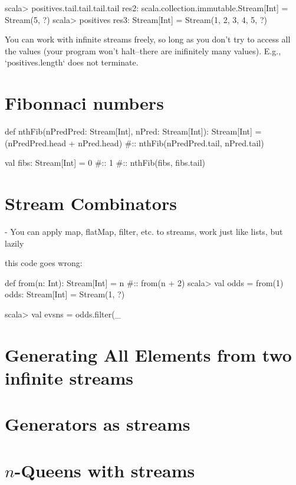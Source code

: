 \begin{console}
scala> positives.tail.tail.tail.tail
res2: scala.collection.immutable.Stream[Int] = Stream(5, ?)
scala> positives
res3: Stream[Int] = Stream(1, 2, 3, 4, 5, ?)
\end{console}

You can work with infinite streams freely, so long as you don't try to access
all the values (your program won't halt--there are inifinitely many values).
E.g., `positives.length` does not terminate.

\section{Fibonnaci numbers}

\begin{scalacode}
def nthFib(nPredPred: Stream[Int], nPred: Stream[Int]): Stream[Int] = {
  (nPredPred.head + nPred.head) #:: nthFib(nPredPred.tail, nPred.tail)
}

val fibs: Stream[Int] = 0 #:: 1 #:: nthFib(fibs, fibs.tail)
\end{scalacode}

\section{Stream Combinators}

- You can apply map, flatMap, filter, etc. to streams, work just like lists, but
  lazily

this code goes wrong:

\begin{scalacode}
def from(n: Int): Stream[Int] = n #:: from(n + 2)
scala> val odds = from(1)
odds: Stream[Int] = Stream(1, ?)

scala> val evsns = odds.filter(_ %
\end{scalacode}

\section{Generating All Elements from two infinite streams}

\section{Generators as streams}

\section{$n$-Queens with streams} 




